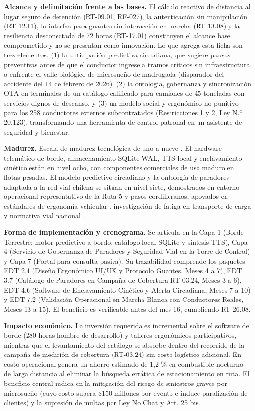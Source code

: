 \textbf{Alcance y delimitación frente a las bases.} El cálculo reactivo de distancia al lugar seguro de detención (RT-09.01, RF-027), la autenticación sin manipulación (RT-12.11), la interfaz para guantes sin interacción en marcha (RT-13.08) y la resiliencia desconectada de 72 horas (RT-17.01) constituyen el alcance base comprometido y no se presentan como innovación. Lo que agrega esta ficha son tres elementos: (1) la anticipación predictiva circadiana, que sugiere pausas preventivas antes de que el conductor ingrese a tramos críticos sin infraestructura o enfrente el valle biológico de microsueño de madrugada (disparador del accidente del 14 de febrero de 2026), (2) la ontología, gobernanza y sincronización OTA en terminales de un catálogo calificado para camiones de 45 toneladas con servicios dignos de descanso, y (3) un modelo social y ergonómico no punitivo para los 258 conductores externos subcontratados (Restricciones 1 y 2, Ley N.º 20.123), transformando una herramienta de control patronal en un asistente de seguridad y bienestar.

\textbf{Madurez.} Escala de madurez tecnológica de uno a nueve \parencite{iso16290}. El hardware telemático de borde, almacenamiento SQLite WAL, TTS local y enclavamiento cinético están en nivel ocho, con componentes comerciales de uso maduro en flotas pesadas. El modelo predictivo circadiano y la ontología de paradores adaptada a la red vial chilena se sitúan en nivel siete, demostrados en entorno operacional representativo de la Ruta 5 y pasos cordilleranos, apoyados en estándares de ergonomía vehicular \parencite{iso15005,iso9241_210}, investigación de fatiga en transporte de carga \parencite{fmcsa_fatigue_2020} y normativa vial nacional \parencite{ley21377,codigo_trabajo_25bis}.

\textbf{Forma de implementación y cronograma.} Se articula en la Capa 1 (Borde Terrestre: motor predictivo a bordo, catálogo local SQLite y síntesis TTS), Capa 4 (Servicio de Gobernanza de Paradores y Seguridad Vial en la Torre de Control) y Capa 7 (Portal para consulta pasiva). Su trazabilidad comprende los paquetes EDT 2.4 (Diseño Ergonómico UI/UX y Protocolo Guantes, Meses 4 a 7), EDT 3.7 (Catálogo de Paradores en Campaña de Cobertura RT-03.24, Meses 3 a 6), EDT 4.6 (Software de Enclavamiento Cinético y Alerta Circadiana, Meses 7 a 10) y EDT 7.2 (Validación Operacional en Marcha Blanca con Conductores Reales, Meses 13 a 15). El beneficio es verificable antes del mes 16, cumpliendo RT-26.08.

\textbf{Impacto económico.} La inversión requerida es incremental sobre el software de borde (280 horas-hombre de desarrollo) y talleres ergonómicos participativos, mientras que el levantamiento del catálogo se absorbe dentro del recorrido de la campaña de medición de cobertura (RT-03.24) sin costo logístico adicional. En costo operacional genera un ahorro estimado de 1,2 \% en combustible nocturno de larga distancia al eliminar la búsqueda errática de estacionamiento en ruta. El beneficio central radica en la mitigación del riesgo de siniestros graves por microsueño (cuyo costo supera \$150 millones por evento e induce paralización de clientes) y la supresión de multas por Ley No Chat y Art. 25 bis.

